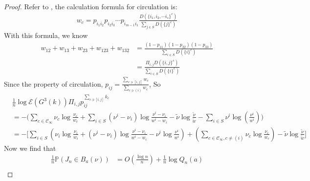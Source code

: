 \documentclass[11pt,en,cite=authoryear]{elegantpaper}
\begin{document}
\begin{proof}
    Refer to \cite{jiang2004mathematical}, the calculation formula
    for circulation is:
    \begin{align*}
        w_c = p_{i_1 i_2} p_{i_2 i_3} \cdots p_{i_{m-1} i_1} \frac{D(\{i_1, i_2, \cdots i_s\}^c)}{\sum_{j\in S} D(\{j\}^c)}
    \end{align*}
    With this formula, we know
    \begin{align*}
        w_{12}+w_{13}+w_{23}+w_{123}+w_{132} &= \frac{(1-p_{11})(1-p_{22})(1-p_{33})}{\sum_{i\in S} D(\{i\}^c)} \\
        &= \frac{\Pi_{i, j} D(\{i, j\}^c)}{\sum_{i\in S} D(\{i\}^c)}
    \end{align*}
    Since the property of circulation, $p_{ij} = \frac{\sum_{c \ni [i,j]} w_c}{\sum_{c \ni (i)} w_c}$, So
    \begin{align*}
        &\frac{1}{n} \log \mathcal{E} (G^3(k)) \Pi_{i, j} p_{ij}^{\sum_{c \ni [i,j]} k_{c}} \\
        &= -\bigl(\sum_{c \in \mathcal{C}_{\infty}} \nu_{c} \log \frac{\nu_{c}}{w_c} + \sum_{i\in S}(\nu^i - \nu_i)\log \frac{\nu^i - \nu_i}{w^i - w_i} 
        -\tilde{\nu}\log \frac{\tilde{\nu} }{\tilde{w} }
        -\sum_{i\in S} \nu^i \log (\frac{\nu^i}{w^i}) \bigr) \\
        &= -\biggl[\sum_{i\in S} \left(\nu_{i}\log \frac{\nu_{i}}{w_i} + (\nu^i - \nu_i)\log \frac{\nu^i - \nu_i}{w^i - w_i} 
        - \nu^i \log \frac{\nu^i}{w^i} \right)
        + \left(\sum_{c \in \mathcal{C}_{\infty}, c\neq (i)} \nu_{c} \log \frac{\nu_{c}}{w_c} \right)
        -\tilde{\nu}\log \frac{\tilde{\nu} }{\tilde{w} }\biggr]
    \end{align*}
    Now we find that
    \begin{align*}
        \frac{1}{n} \mathbb{P}(J_n \in B_a(\nu))
        &= O(\frac{\log n}{n}) + \frac{1}{n} \log Q_n(a) \\

\end{align*}
\end{proof}
\end{document}
